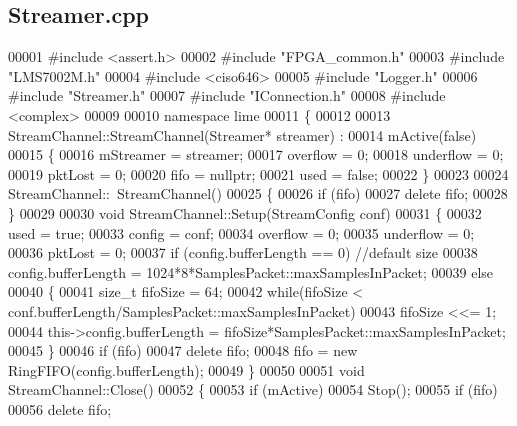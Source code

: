 \subsection{Streamer.\+cpp}
\label{Streamer_8cpp_source}

\begin{DoxyCode}
00001 \textcolor{preprocessor}{#include <assert.h>}
00002 \textcolor{preprocessor}{#include "FPGA_common.h"}
00003 \textcolor{preprocessor}{#include "LMS7002M.h"}
00004 \textcolor{preprocessor}{#include <ciso646>}
00005 \textcolor{preprocessor}{#include "Logger.h"}
00006 \textcolor{preprocessor}{#include "Streamer.h"}
00007 \textcolor{preprocessor}{#include "IConnection.h"}
00008 \textcolor{preprocessor}{#include <complex>}
00009 
00010 \textcolor{keyword}{namespace }lime
00011 \{
00012 
00013 StreamChannel::StreamChannel(Streamer* streamer) :
00014     mActive(false)
00015 \{
00016     mStreamer = streamer;
00017     overflow = 0;
00018     underflow = 0;
00019     pktLost = 0;
00020     fifo = \textcolor{keyword}{nullptr};
00021     used = \textcolor{keyword}{false};
00022 \}
00023 
00024 StreamChannel::~StreamChannel()
00025 \{
00026     \textcolor{keywordflow}{if} (fifo)
00027         \textcolor{keyword}{delete} fifo;
00028 \}
00029 
00030 \textcolor{keywordtype}{void} StreamChannel::Setup(StreamConfig conf)
00031 \{
00032     used = \textcolor{keyword}{true};
00033     config = conf;
00034     overflow = 0;
00035     underflow = 0;
00036     pktLost = 0;
00037     \textcolor{keywordflow}{if} (config.bufferLength == 0) \textcolor{comment}{//default size}
00038         config.bufferLength = 1024*8*SamplesPacket::maxSamplesInPacket;
00039     \textcolor{keywordflow}{else}
00040     \{
00041         \textcolor{keywordtype}{size\_t} fifoSize = 64;
00042         \textcolor{keywordflow}{while}(fifoSize < conf.bufferLength/SamplesPacket::maxSamplesInPacket)
00043             fifoSize <<= 1;
00044         this->config.bufferLength = fifoSize*SamplesPacket::maxSamplesInPacket;
00045     \}
00046     \textcolor{keywordflow}{if} (fifo)
00047         \textcolor{keyword}{delete} fifo;
00048     fifo = \textcolor{keyword}{new} RingFIFO(config.bufferLength);
00049 \}
00050 
00051 \textcolor{keywordtype}{void} StreamChannel::Close()
00052 \{
00053     \textcolor{keywordflow}{if} (mActive)
00054         Stop();
00055     \textcolor{keywordflow}{if} (fifo)
00056         \textcolor{keyword}{delete} fifo;

\end{DoxyCode}
